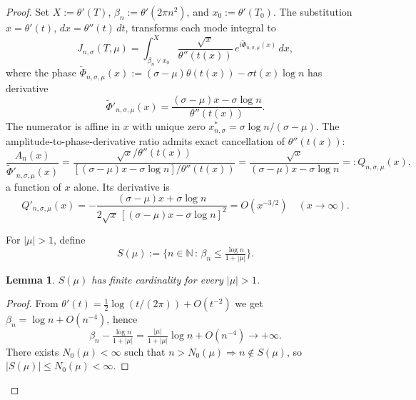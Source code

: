 \documentclass[12pt]{article}
\newtheorem{lemma}{Lemma}
\begin{document}
\begin{proof}
Set $X:=\theta'(T)$, $\beta_n:=\theta'(2\pi n^{2})$, and $x_0:=\theta'(T_0)$. The substitution $x=\theta'(t)$, $dx=\theta''(t)\,dt$, transforms each mode integral to
\begin{equation}
J_{n,\sigma}(T,\mu) = \int_{\beta_n\vee x_0}^{X}\frac{\sqrt{x}}{\theta''(t(x))}\,e^{i\widetilde{\Phi}_{n,\sigma,\mu}(x)}\,dx,
\end{equation}
where the phase $\widetilde{\Phi}_{n,\sigma,\mu}(x):=(\sigma-\mu)\theta(t(x))-\sigma t(x)\log n$ has derivative
\begin{equation}
\widetilde{\Phi}'_{n,\sigma,\mu}(x) = \frac{(\sigma-\mu)x - \sigma\log n}{\theta''(t(x))}.
\end{equation}
The numerator is affine in $x$ with unique zero $x^{*}_{n,\sigma}=\sigma\log n/(\sigma-\mu)$. The amplitude-to-phase-derivative ratio admits exact cancellation of $\theta''(t(x))$:
\begin{equation}
\frac{A_{n}(x)}{\widetilde{\Phi}'_{n,\sigma,\mu}(x)} = \frac{\sqrt{x}/\theta''(t(x))}{[(\sigma-\mu)x-\sigma\log n]/\theta''(t(x))} = \frac{\sqrt{x}}{(\sigma-\mu)x - \sigma\log n} =: Q_{n,\sigma,\mu}(x),
\end{equation}
a function of $x$ alone. Its derivative is
\begin{equation}
Q'_{n,\sigma,\mu}(x) = -\frac{(\sigma-\mu)x + \sigma\log n}{2\sqrt{x}\,[(\sigma-\mu)x - \sigma\log n]^{2}} = O(x^{-3/2}) \quad (x\to\infty).
\end{equation}

For $|\mu|>1$, define
\begin{equation}
S(\mu) := \bigl\{n\in\mathbb{N}\,:\,\beta_n\le\tfrac{\log n}{1+|\mu|}\bigr\}.
\end{equation}

\begin{lemma}
$S(\mu)$ has finite cardinality for every $|\mu|>1$.
\end{lemma}
\begin{proof}
From $\theta'(t)=\tfrac{1}{2}\log(t/(2\pi))+O(t^{-2})$ we get $\beta_n=\log n + O(n^{-4})$, hence
\begin{equation}
\beta_n - \tfrac{\log n}{1+|\mu|} = \tfrac{|\mu|}{1+|\mu|}\log n + O(n^{-4}) \longrightarrow +\infty.
\end{equation}
There exists $N_{0}(\mu)<\infty$ such that $n>N_{0}(\mu)\Rightarrow n\notin S(\mu)$, so $|S(\mu)|\le N_{0}(\mu)<\infty$.
\end{proof}


\end{proof}
\end{document}
